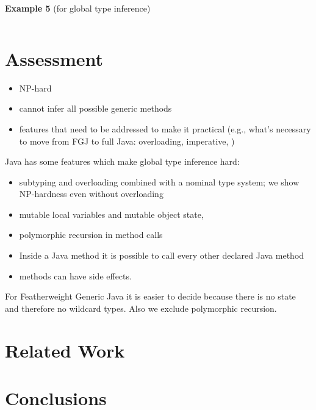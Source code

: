 \documentclass[runningheads]{llncs}
\begin{document}
\textbf{Example 5} (for global type inference)
\begin{lstlisting}

\end{lstlisting}

\section{Assessment}
\label{sec:assessment}

\begin{itemize}
\item NP-hard 
\item cannot infer all possible generic methods
\item features that need to be addressed to make it practical (e.g.,
  what's necessary to move from FGJ to full Java: overloading,
  imperative, )
\end{itemize}

Java has some features which make global type inference hard:
\begin{itemize}
\item subtyping and overloading combined with a nominal type system;
  we show NP-hardness even without overloading
\item mutable local variables and mutable object state,
\item polymorphic recursion in method calls
\item Inside a Java method it is possible to call every other declared Java method
\item methods can have side effects.
\end{itemize}


For Featherweight Generic Java it is easier to decide because there is no state and therefore no wildcard types.
Also we exclude polymorphic recursion.


\section{Related Work}


\section{Conclusions}
\label{sec:conclusions}




\end{document}
